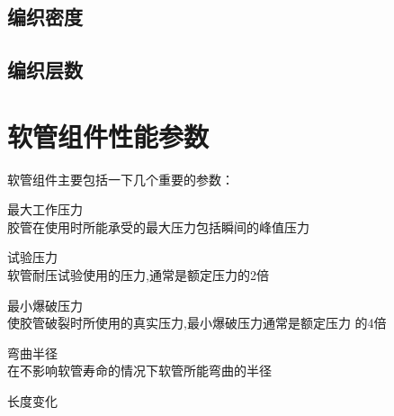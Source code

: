 \subsection{编织密度}


\subsection{编织层数}






\section{软管组件性能参数}

软管组件主要包括一下几个重要的参数：
\begin{compactenum}
	\item 最大工作压力\\
	胶管在使用时所能承受的最大压力包括瞬间的峰值压力
	\item 试验压力\\
	软管耐压试验使用的压力,通常是额定压力的2倍
	\item 最小爆破压力\\
	使胶管破裂时所使用的真实压力,最小爆破压力通常是额定压力 的4倍
	\item 弯曲半径\\
	在不影响软管寿命的情况下软管所能弯曲的半径
	\item 长度变化\\
\end{compactenum}





